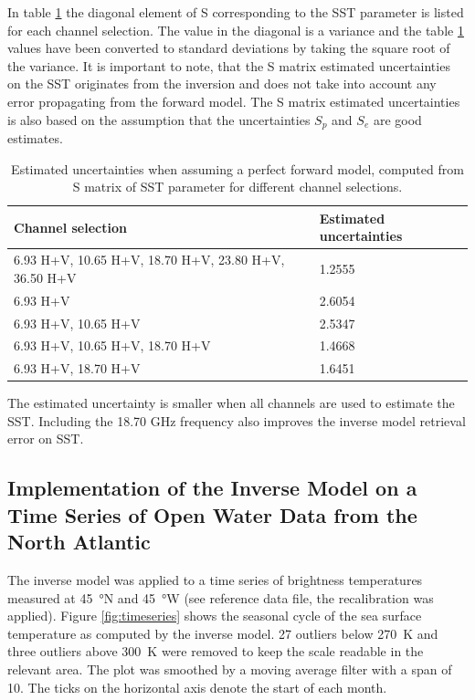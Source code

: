\documentclass[11pt, a4paper]{article}
\begin{document}
In table \ref{tab:task3b_2} the diagonal element of S corresponding to the SST parameter is listed for each channel selection. The value in the diagonal is a variance and the table \ref{tab:task3b_2} values have been converted to standard deviations by taking the square root of the variance. It is important to note, that the S matrix estimated uncertainties on the SST originates from the inversion and does not take into account any error propagating from the forward model. The S matrix estimated uncertainties is also based on the assumption that the uncertainties \(S_p\) and \(S_e\) are good estimates. 

\begin{table}[h!]
	\centering
	\begin{tabular}{@{}p{11cm}p{4cm}@{}}
		Channel selection & Estimated uncertainties 
		\tabularnewline
		\midrule
		6.93 H+V, 10.65 H+V, 18.70 H+V, 23.80 H+V, 36.50 H+V & 1.2555	\\
		6.93 H+V	& 2.6054	\\
		6.93 H+V, 10.65 H+V	& 2.5347	\\
		6.93 H+V, 10.65 H+V, 18.70 H+V	& 1.4668		\\
		6.93 H+V, 18.70 H+V	& 1.6451	\\
		\midrule
	\end{tabular}
	\caption{Estimated uncertainties when assuming a perfect forward model, computed from S matrix of SST parameter for different channel selections.}
	\label{tab:task3b_2}
\end{table}

The estimated uncertainty is smaller when all channels are used to estimate the SST. Including the 18.70 GHz frequency also improves the inverse model retrieval error on SST.











\subsection{Implementation of the Inverse Model on a Time Series of Open Water Data from the North Atlantic}

The inverse model was applied to a time series of brightness temperatures measured at \SI{45}{\degree}N and \SI{45}{\degree}W (see reference data file, the recalibration was applied). Figure \ref{fig:timeseries} shows the seasonal cycle of the sea surface temperature  as computed by the inverse model. 27 outliers below \SI{270}{K} and three outliers above \SI{300}{K} were removed to keep the scale readable in the relevant area. The plot was smoothed by a moving average filter with a span of \SI{10}{}. The ticks on the horizontal axis denote the start of each month.
\end{document}
